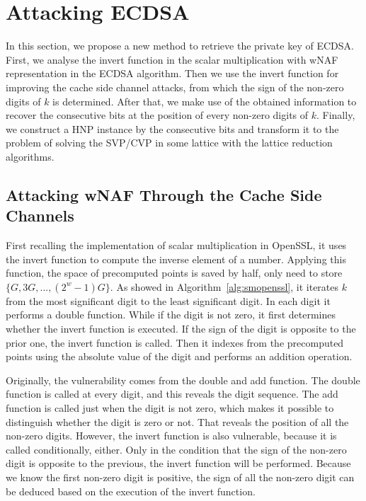 \section{Attacking ECDSA}
\label{sec:attack}
In this section, we propose a new method to retrieve the private key of ECDSA.
First, we analyse the invert function in the scalar multiplication with wNAF representation in the ECDSA algorithm.
 Then we use the invert function for improving the cache side channel attacks, from which the sign of the non-zero digits of $k$ is determined.
After that, we make use of the obtained information to recover the consecutive bits at the position of every non-zero digits of $k$.
Finally, we construct a HNP instance by the consecutive bits and transform it to the problem of solving the SVP/CVP in some lattice with the lattice reduction algorithms.

\subsection{Attacking wNAF Through the Cache Side Channels}
\label{data_get}
First recalling the implementation of scalar multiplication in OpenSSL, it uses the invert function to
  compute the inverse element of a number.
Applying this function, the space of precomputed points is saved by half, only need to store $\{G, 3G, ..., (2^{w} - 1)G\}$.
As showed in Algorithm~\ref{alg:smopenssl},
it iterates $k$ from the most significant digit to the least significant digit.
In each digit it performs a double function.
While if the digit is not zero, it first determines whether the invert function is executed.
 If the sign of the digit is opposite to the prior one, the invert function is called.
Then it indexes from the precomputed points using the absolute value of the digit and performs an addition operation.

Originally, the vulnerability comes from the double and add function.
The double function is called at every digit, and this reveals the digit sequence.
The add function is called just when the digit is not zero,
  which makes it possible to distinguish whether the digit is zero or not.
  That reveals the position of all the non-zero digits.
However,
 the invert function is also vulnerable, because it is called conditionally, either.
Only in the condition that the sign of the non-zero digit is opposite to the previous, the invert function will be performed.
Because we know the first non-zero digit is positive,
   the sign of all the non-zero digit can be deduced based on the execution of the invert function.


